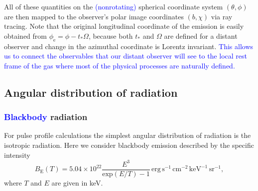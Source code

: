 \documentclass{aa}
\newcommand{\refe}[1]{\textcolor{blue}{{#1}}}
\newcommand{\refedel}[1]{}
\begin{document}
All of these quantities on the \refe{(nonrotating)}\refedel{ star's} spherical coordinate system $(\theta, \phi)$ are then mapped to the observer's polar image coordinates $(b, \chi)$ via ray tracing.
Note that the original longitudinal coordinate of the emission is easily obtained from $\phi_{\mathrm{e}} = \phi - t_* \Omega$, because both $t_*$ and $\Omega$ are defined for a distant observer and change in the azimuthal coordinate is Lorentz invariant.
\refe{This allows us to connect the observables that our distant observer will see to the local rest frame of the gas where most of the physical processes are naturally defined.}

\refedel{
This ends our discussion of ray tracing from the image plane to the star.
In many ways, it is the more intuitive direction, even though the time coordinate is propagated backwards, because it forces us to think from the point of view of the observer.
}



\subsection{Angular distribution of radiation}\label{sect:angular_distr}
\subsubsection{\refe{Blackbody} radiation}

For pulse profile calculations the simplest angular distribution of radiation is the isotropic radiation.
Here we consider blackbody emission described by the specific intensity
\begin{equation}
  B_{\mathrm{E}}(T) = 5.04 \times 10^{22} \frac{E^3}{\mathrm{exp}(E/T) -1} \,\mathrm{erg}\,\mathrm{s}^{-1}\,\mathrm{cm}^{-2}\,\mathrm{keV}^{-1}\,\mathrm{sr}^{-1},
\end{equation}
where $T$ and $E$ are given in keV.
\refedel{The radiation is isotropic and there is no dependence on the angle $\alpha'=\cos^{-1}\mu'$, measured relative to the surface normal by the co-rotating observer.}
\end{document}
